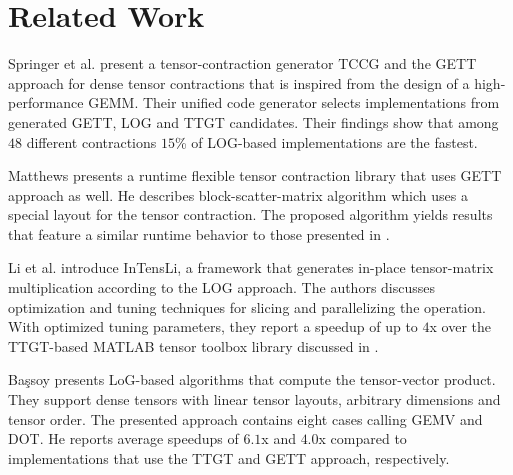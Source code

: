 \section{Related Work}
\label{sec:related}

\begin{comment}
The authors in \cite{dinapoli:2014:towards.efficient.use} discuss the efficient tensor contractions with highly optimized BLAS. 
Based on the LoG approach, they define requirements for the use of \tf{gemm} for class 3 tensor contractions and provide slicing techniques for tensors. %
The slicing recipe for the class 2 categorized tensor contractions contains a short description with a rule of thumb for maximizing performance.
Runtime measurements cover class 3 tensor contractions.
\end{comment}

Springer et al. \cite{springer:2018:design} present a tensor-contraction generator TCCG and the GETT approach for dense tensor contractions that is inspired from the design of a high-performance GEMM.
Their unified code generator selects implementations from generated GETT, LOG and TTGT candidates.
Their findings show that among $48$ different contractions $15$\% of LOG-based implementations are the fastest.

Matthews \cite{matthews:2018:high} presents a runtime flexible tensor contraction library that uses GETT approach as well.
He describes block-scatter-matrix algorithm which uses a special layout for the tensor contraction.
The proposed algorithm yields results that feature a similar runtime behavior to those presented in \cite{springer:2018:design}.

Li et al. \cite{li:2015:input} introduce InTensLi, a framework that generates in-place tensor-matrix multiplication according to the LOG approach. 
The authors discusses optimization and tuning techniques for slicing and parallelizing the operation.
With optimized tuning parameters, they report a speedup of up to $4$x over the TTGT-based MATLAB tensor toolbox library discussed in \cite{bader:2006:algorithm862}.

Ba\c{s}soy \cite{bassoy:2019:ttv} presents LoG-based algorithms that compute the tensor-vector product. 
They support dense tensors with linear tensor layouts, arbitrary dimensions and tensor order.
The presented approach contains eight cases calling GEMV and DOT.
He reports average speedups of $6.1$x and $4.0$x compared to implementations that use the TTGT and GETT approach, respectively.


